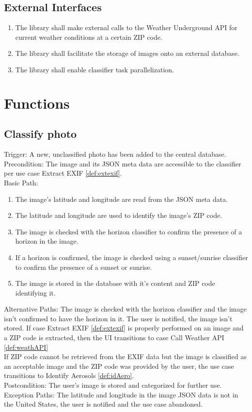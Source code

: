 \documentclass[journal,10pt,draftclsnofoot,onecolumn]{IEEEtran}
\begin{document}
\begin{singlespace}
	\subsection{External Interfaces}
		\begin{enumerate}
			\item The library shall make external calls to the Weather Underground API \cite{api_weather_underground} for current weather conditions at a certain ZIP code.
			\item The library shall facilitate the storage of images onto an external database.
			\item The library shall enable classifier task parallelization.
		\end{enumerate}
\clearpage

\section{Functions}
	\subsection{Classify photo} \label{def:classPh}
		Trigger: A new, unclassified photo has been added to the central database.\\
		Precondition: The image and its JSON meta data are accessible to the classifier per use case Extract EXIF \ref{def:extexif}.\\
		Basic Path:
		\begin{enumerate}
			\item The image's latitude and longitude are read from the JSON meta data.
			\item The latitude and longitude are used to identify the image's ZIP code.
			\item The image is checked with the horizon classifier to confirm the presence of a horizon in the image.
			\item If a horizon is confirmed, the image is checked using a sunset/sunrise classifier to confirm the presence of a sunset or sunrise.
			\item The image is stored in the database with it's content and ZIP code identifying it.
		\end{enumerate}
		Alternative Paths: The image is checked with the horizon classifier and the image isn't confirmed to have the horizon in it. The user is notified, the image isn't stored. If case Extract EXIF \ref{def:extexif} is properly performed on an image and a ZIP code is extracted, then the UI transitions to case Call Weather API \ref{def:weathAPI}\\
		If ZIP code cannot be retrieved from the EXIF data but the image is classified as an acceptable image and the ZIP code was provided by the user, the use case transitions to Identify Aerosols \ref{def:idAero}.\\
		Postcondition: The user's image is stored and categorized for further use.\\
		Exception Paths: The latitude and longitude in the image JSON data is not in the United States, the user is notified and the use case abandoned. 
	

\end{singlespace}
\end{document}
